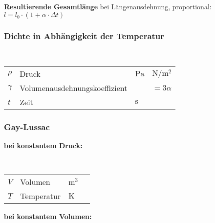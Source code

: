 \documentclass[a4paper, 11pt]{article}
\begin{document}
\textbf{Resultierende Gesamtlänge} bei Längenausdehnung, proportional: \\
$l = l_{0} \cdot \left( 1 + \alpha \cdot \Delta t \right) $

\subsubsection{Dichte in Abhängigkeit der Temperatur}
\begin{minipage}{0.45\textwidth}
  \\

\end{minipage}
\begin{minipage}{0.45\textwidth}

\begin{tabular}{llll}
$\rho$ & Druck & $\si{\pascal} $ & $\si{\newton\per\square\metre}$ \\
$\gamma $ & Volumenausdehnungskoeffizient &  & $= 3 \alpha$ \\
$t$ & Zeit & $\si{\second}$ & \\
\end{tabular}

\end{minipage}

\subsubsection{Gay-Lussac}
 
\textbf{bei konstantem Druck:} \\

\begin{minipage}{0.45\textwidth}
  \\

\end{minipage}
\begin{minipage}{0.45\textwidth}

\begin{tabular}{llll}
$V$ & Volumen & $\si{\cubic\meter}$ & \\
$T$ & Temperatur & $\si{\kelvin}$  &  \\
\end{tabular}

\end{minipage} 

\textbf{bei konstantem Volumen:}\\
\end{document}
